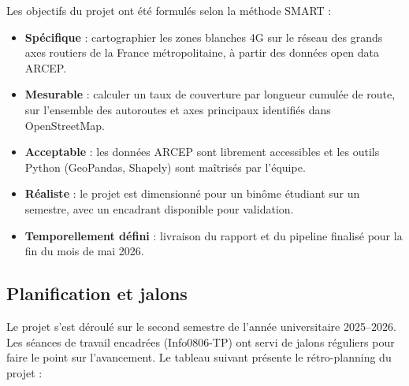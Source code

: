 \documentclass[11pt,a4paper]{article}
\begin{document}
Les objectifs du projet ont été formulés selon la méthode SMART :

\begin{itemize}
  \item \textbf{Spécifique} : cartographier les zones blanches 4G sur le réseau des grands axes routiers de la France métropolitaine, à partir des données open data ARCEP.
  \item \textbf{Mesurable} : calculer un taux de couverture par longueur cumulée de route, sur l'ensemble des autoroutes et axes principaux identifiés dans OpenStreetMap.
  \item \textbf{Acceptable} : les données ARCEP sont librement accessibles et les outils Python (GeoPandas, Shapely) sont maîtrisés par l'équipe.
  \item \textbf{Réaliste} : le projet est dimensionné pour un binôme étudiant sur un semestre, avec un encadrant disponible pour validation.
  \item \textbf{Temporellement défini} : livraison du rapport et du pipeline finalisé pour la fin du mois de mai 2026.
\end{itemize}

\subsection{Planification et jalons}

Le projet s'est déroulé sur le second semestre de l'année universitaire 2025--2026. Les séances de travail encadrées (Info0806-TP) ont servi de jalons réguliers pour faire le point sur l'avancement. Le tableau suivant présente le rétro-planning du projet :
\end{document}
